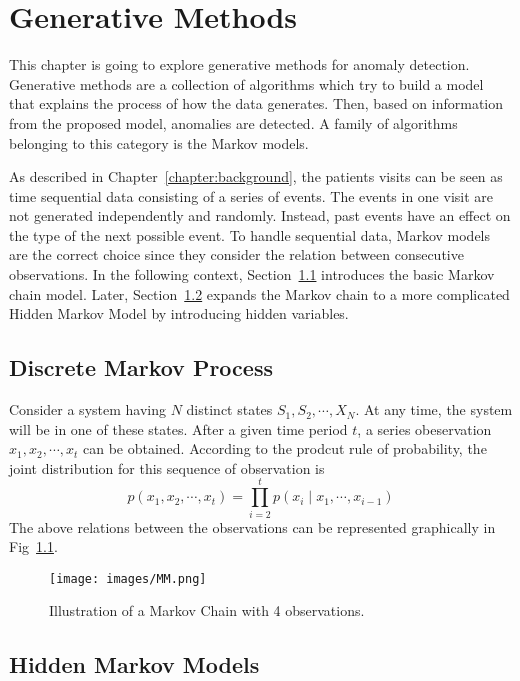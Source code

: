 \chapter{Generative Methods}
\label{chapter:generative}
This chapter is going to explore generative methods for anomaly detection. Generative methods are a collection of algorithms which try to build a model that explains the process of how the data generates. Then, based on information from the proposed model, anomalies are detected. A family of algorithms belonging to this category is the Markov models.

As described in Chapter~\ref{chapter:background}, the patients visits can be seen as time sequential data consisting of a series of events. The events in one visit are not generated independently and randomly. Instead, past events have an effect on the type of the next possible event. To handle sequential data, Markov models are the correct choice since they consider the relation between consecutive observations. In the following context, Section~\ref{sec:MM} introduces the basic Markov chain model. Later, Section~\ref{sec:HMM} expands the Markov chain to a more complicated Hidden Markov Model by introducing hidden variables.

\section{Discrete Markov Process}
\label{sec:MM}
Consider a system having \(N\) distinct states \(S_1, S_2, \cdots, X_N\). At any time, the system will be in one of these states. After a given time period \(t\), a series obeservation \(x_1, x_2, \cdots, x_t\) can be obtained. According to the prodcut rule of probability, the joint distribution for this sequence of observation is
\[
p(x_1, x_2, \cdots, x_t) = \prod_{i = 2}^{t} p(x_i \mid x_1, \cdots, x_{i-1})
\]
The above relations between the observations can be represented graphically in Fig~\ref{fig:MM}.
\begin{figure}
	\begin{center}
		\texttt{[image: images/MM.png]}
		\caption{Illustration of a Markov Chain with 4 observations.}
		\label{fig:MM}
	\end{center}
\end{figure}
\section{Hidden Markov Models}
\label{sec:HMM}






